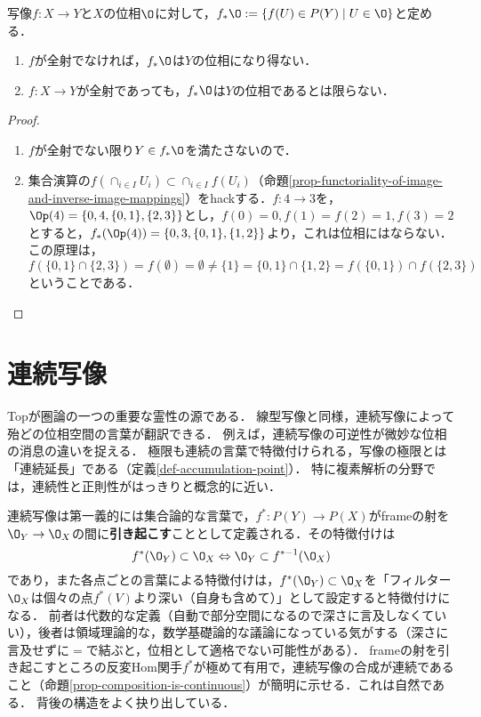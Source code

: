 \documentclass[uplatex,dvipdfmx]{jsreport}
\begin{document}
\begin{proposition}
    写像$f:X\to Y$と$X$の位相$\O$に対して，$f_*\O:=\{f(U)\in P(Y)\mid U\in\O\}$と定める．
    \begin{enumerate}
        \item $f$が全射でなければ，$f_*\O$は$Y$の位相になり得ない．
        \item $f:X\to Y$が全射であっても，$f_*\O$は$Y$の位相であるとは限らない．
    \end{enumerate}
\end{proposition}
\begin{proof}\mbox{}
    \begin{enumerate}
        \item $f$が全射でない限り$Y\in f_*\O$を満たさないので．
        \item 集合演算の$f(\cap_{i\in I}U_i)\subset \cap_{i\in I}f(U_i)$（命題\ref{prop-functoriality-of-image-and-inverse-image-mappings}）をhackする．$f:4\to 3$を，$\Op(4)=\{0,4,\{0,1\},\{2,3\}\}$とし，$f(0)=0,f(1)=f(2)=1,f(3)=2$とすると，$f_*(\Op(4))=\{0,3,\{0,1\},\{1,2\}\}$より，これは位相にはならない．
        この原理は，$f(\{0,1\}\cap\{2,3\})=f(\emptyset)=\emptyset\ne\{1\}=\{0,1\}\cap\{1,2\}=f(\{0,1\})\cap f(\{2,3\})$ということである．
    \end{enumerate}
\end{proof}


\section{連続写像}

\begin{tcolorbox}[colframe=ForestGreen, colback=ForestGreen!10!white, breakable]
    Topが圏論の一つの重要な霊性の源である．
    線型写像と同様，連続写像によって殆どの位相空間の言葉が翻訳できる．
    例えば，連続写像の可逆性が微妙な位相の消息の違いを捉える．
    極限も連続の言葉で特徴付けられる，写像の極限とは「連続延長」である（定義\ref{def-accumulation-point}）．
    特に複素解析の分野では，連続性と正則性がはっきりと概念的に近い．

    連続写像は第一義的には集合論的な言葉で，$f^*:P(Y)\to P(X)$がframeの射を$\O_Y\to\O_X$の間に\textbf{引き起こす}こととして定義される．その特徴付けは
    \[f^*(\O_Y)\subset\O_X\Leftrightarrow\O_Y\subset f^{*-1}(\O_X)\]
    であり，また各点ごとの言葉による特徴付けは，$f^*(\O_Y)\subset\O_X$を「フィルター$\O_X$は個々の点$f^*(V)$より深い（自身も含めて）」として設定すると特徴付けになる．
    前者は代数的な定義（自動で部分空間になるので深さに言及しなくていい），後者は領域理論的な，数学基礎論的な議論になっている気がする（深さに言及せずに$=$で結ぶと，位相として適格でない可能性がある）．
    frameの射を引き起こすところの反変Hom関手$f^*$が極めて有用で，連続写像の合成が連続であること（命題\ref{prop-composition-is-continuous}）が簡明に示せる．これは自然である．
    背後の構造をよく抉り出している．
\end{tcolorbox}
\end{document}

